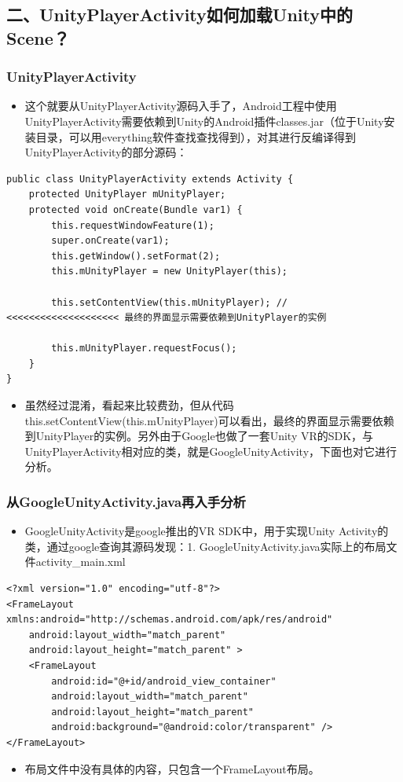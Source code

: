 \documentclass[9pt, b5paper]{article}
\begin{document}
\subsection{二、UnityPlayerActivity如何加载Unity中的Scene？}
\label{sec-2-2}
\subsubsection{UnityPlayerActivity}
\label{sec-2-2-1}
\begin{itemize}
\item 这个就要从UnityPlayerActivity源码入手了，Android工程中使用UnityPlayerActivity需要依赖到Unity的Android插件classes.jar（位于Unity安装目录，可以用everything软件查找查找得到），对其进行反编译得到UnityPlayerActivity的部分源码：
\end{itemize}
\begin{verbatim}
public class UnityPlayerActivity extends Activity {
    protected UnityPlayer mUnityPlayer;
    protected void onCreate(Bundle var1) {
        this.requestWindowFeature(1);
        super.onCreate(var1);
        this.getWindow().setFormat(2);
        this.mUnityPlayer = new UnityPlayer(this);

        this.setContentView(this.mUnityPlayer); // <<<<<<<<<<<<<<<<<<<< 最终的界面显示需要依赖到UnityPlayer的实例

        this.mUnityPlayer.requestFocus();
    }
}
\end{verbatim}
\begin{itemize}
\item 虽然经过混淆，看起来比较费劲，但从代码this.setContentView(this.mUnityPlayer)可以看出，最终的界面显示需要依赖到UnityPlayer的实例。另外由于Google也做了一套Unity VR的SDK，与UnityPlayerActivity相对应的类，就是GoogleUnityActivity，下面也对它进行分析。
\end{itemize}
\subsubsection{从GoogleUnityActivity.java再入手分析}
\label{sec-2-2-2}
\begin{itemize}
\item GoogleUnityActivity是google推出的VR SDK中，用于实现Unity Activity的类，通过google查询其源码发现：1. GoogleUnityActivity.java实际上的布局文件activity\_main.xml
\end{itemize}
\begin{verbatim}
<?xml version="1.0" encoding="utf-8"?>
<FrameLayout xmlns:android="http://schemas.android.com/apk/res/android"
    android:layout_width="match_parent"
    android:layout_height="match_parent" >
    <FrameLayout
        android:id="@+id/android_view_container"
        android:layout_width="match_parent"
        android:layout_height="match_parent"
        android:background="@android:color/transparent" />
</FrameLayout>
\end{verbatim}
\begin{itemize}
\item 布局文件中没有具体的内容，只包含一个FrameLayout布局。
\end{itemize}
\end{document}
